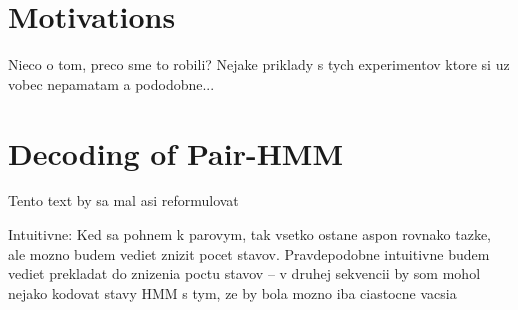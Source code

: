 \section{Motivations}
Nieco o tom, preco sme to robili? Nejake priklady s tych experimentov ktore si
uz vobec nepamatam a pododobne...

\section{Decoding of Pair-HMM}

\begin{reformulate*}
Tento text by sa mal asi reformulovat
\end{reformulate*}

\begin{notmytext*}
Intuitivne: Ked sa pohnem k parovym, tak vsetko ostane aspon rovnako tazke, ale mozno budem vediet znizit pocet stavov.
Pravdepodobne intuitivne budem vediet prekladat do znizenia poctu stavov -- v
druhej sekvencii by som mohol nejako kodovat stavy HMM s tym, ze by bola mozno
iba ciastocne vacsia
\end{notmytext*}

\label{LastPage}
